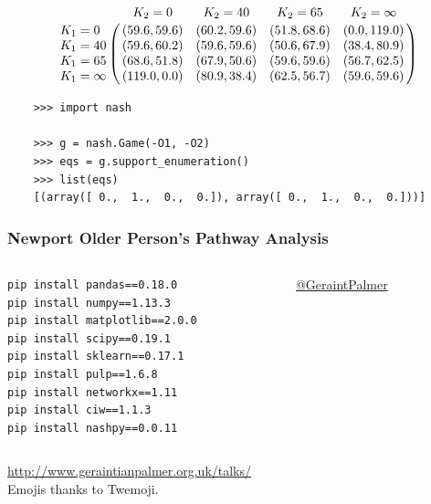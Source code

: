 \documentclass{beamer}
\begin{document}

\begin{frame}[fragile]

\begin{equation*}
\end{equation*}
  $$\bordermatrix{ & K_{2} = 0 & K_{2} = 40 & K_{2} = 65 & K_{2} = \infty \cr
  K_{1} = 0 & (59.6, 59.6) & (60.2, 59.6) & (51.8, 68.6) & (0.0, 119.0) \cr
  K_{1} = 40 & (59.6, 60.2) & (59.6, 59.6) & (50.6, 67.9) & (38.4, 80.9) \cr
  K_{1} = 65 & (68.6, 51.8) & (67.9, 50.6) & (59.6, 59.6) & (56.7, 62.5) \cr
  K_{1} = \infty & (119.0, 0.0) & (80.9, 38.4) & (62.5, 56.7) & (59.6, 59.6) \cr}$$
  \vspace{10mm}
  \pause
  \footnotesize{
  \begin{verbatim}
    >>> import nash

    >>> g = nash.Game(-O1, -O2)
    >>> eqs = g.support_enumeration()
    >>> list(eqs)
    [(array([ 0.,  1.,  0.,  0.]), array([ 0.,  1.,  0.,  0.]))]
  \end{verbatim}
  }
\end{frame}

\begin{frame}
\frametitle{Newport Older Person's Pathway Analysis}
\begin{center}

\end{center}
\end{frame}

\begin{frame}[fragile]
\begin{columns}
\begin{column}{0.6\textwidth}
\begin{verbatim}
pip install pandas==0.18.0
pip install numpy==1.13.3
pip install matplotlib==2.0.0
pip install scipy==0.19.1
pip install sklearn==0.17.1
pip install pulp==1.6.8
pip install networkx==1.11
pip install ciw==1.1.3
pip install nashpy==0.0.11
\end{verbatim}
\end{column}
\begin{column}{0.4\textwidth}
\begin{center}
\textcolor{darkorange}{\href{https://twitter.com/GeraintPalmer}{@GeraintPalmer}}
\end{center}
\end{column}
\end{columns}
\vspace{10mm}
\textcolor{darkorange}{\url{http://www.geraintianpalmer.org.uk/talks/}}\\
\footnotesize{Emojis thanks to Twemoji.}
\end{frame}
\end{document}
